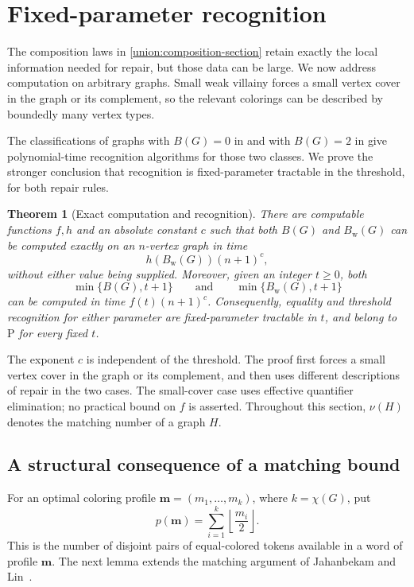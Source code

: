 \documentclass[10pt,a4paper]{amsart}
\numberwithin{equation}{section}
\newtheorem{theorem}{Theorem}[section]
\theoremstyle{definition}
\theoremstyle{remark}
\begin{document}

\section{Fixed-parameter recognition}\label{rec:section}

The composition laws in \cref{union:composition-section} retain exactly
the local information needed for repair, but those data can be large.
We now address computation on arbitrary graphs. Small weak villainy
forces a small vertex cover in the graph or its complement, so the
relevant colorings can be described by boundedly many vertex types.

The classifications of graphs with $B(G)=0$ in
\cite{clark2006} and with $B(G)=2$ in \cite{jahanbekam2021}
give polynomial-time recognition algorithms for those two classes.
We prove the stronger conclusion that recognition is fixed-parameter
tractable in the threshold, for both repair rules.

\begin{theorem}[Exact computation and recognition]\label{rec:main}
\label{rec:exact-parameter}
There are computable functions $f,h$ and an absolute constant $c$
such that both $B(G)$ and $B_{\mathrm w}(G)$ can be computed exactly
on an $n$-vertex graph in time
\[
 h(B_{\mathrm w}(G))(n+1)^c,
\]
without either value being supplied. Moreover, given an integer
$t\geq0$, both
\[
\min\{B(G),t+1\}\qquad\text{and}\qquad
\min\{B_{\mathrm w}(G),t+1\}
\]
can be computed in time $f(t)(n+1)^c$.
Consequently, equality and threshold recognition for either parameter
are fixed-parameter tractable in $t$, and belong to $\mathrm P$
for every fixed $t$.
\end{theorem}

The exponent $c$ is independent of the threshold. The proof first forces
a small vertex cover in the graph or its complement, and then uses
different descriptions of repair in the two cases. The small-cover
case uses effective quantifier elimination; no practical bound on
$f$ is asserted. Throughout this section,
$\nu(H)$ denotes the matching number of a graph $H$.

\subsection{A structural consequence of a matching bound}

For an optimal coloring profile $\mathbf m=(m_1,\ldots,m_k)$, where
$k=\chi(G)$, put
\[
p(\mathbf m)=\sum_{i=1}^k\left\lfloor\frac{m_i}{2}\right\rfloor.
\]
This is the number of disjoint pairs of equal-colored tokens available
in a word of profile $\mathbf m$. The next lemma extends the matching
argument of Jahanbekam and Lin~\cite[Lemma~8]{jahanbekam2021}.
\end{document}
